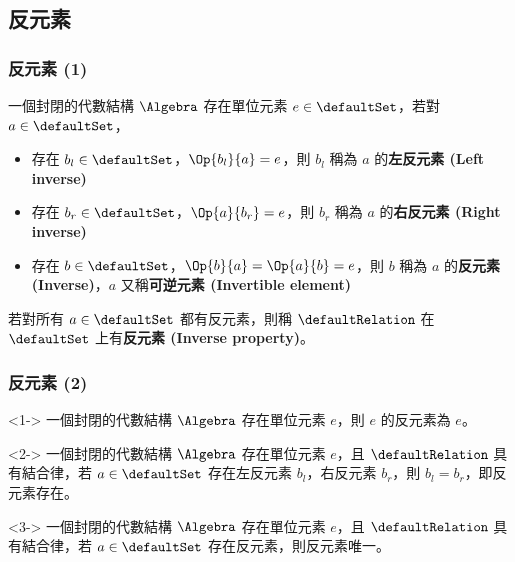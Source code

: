 \documentclass[utf8]{beamer}
\begin{document}
\begin{CJK}{UTF8}{bkai}
\subsection{反元素}

\begin{frame}
  \frametitle{反元素 (1)}
  \begin{mydef}[反元素]
  \label{def:algebra:inverse}
  一個封閉的代數結構 $\Algebra$ 存在單位元素 $e\in{\defaultSet}$，若對 $a\in{\defaultSet}$，
  \begin{itemize}
  \item 存在 $b_l\in{\defaultSet}$，$\Op{b_l}{a}=e$，則 $b_l$ 稱為 $a$ 的\textbf{左反元素 (Left inverse)}
  \item 存在 $b_r\in{\defaultSet}$，$\Op{a}{b_r}=e$，則 $b_r$ 稱為 $a$ 的\textbf{右反元素 (Right inverse)}
  \item 存在 $b\in{\defaultSet}$，$\Op{b}{a}=\Op{a}{b}=e$，則 $b$ 稱為 $a$ 的\textbf{反元素 (Inverse)}，$a$ 又稱\textbf{可逆元素 (Invertible element)}
  \end{itemize}
  若對所有 $a\in{\defaultSet}$ 都有反元素，則稱 $\defaultRelation$ 在 $\defaultSet$ 上有\textbf{反元素 (Inverse property)}。
  \end{mydef}
\end{frame}

\begin{frame}
  \frametitle{反元素 (2)}
  \begin{mypropo}<1->
  \label{pro:algebra:identity_has_inverse}
  一個封閉的代數結構 $\Algebra$ 存在單位元素 $e$，則 $e$ 的反元素為 $e$。
  \end{mypropo}
  \begin{mythm}[反元素存在性*]<2->
  \label{thm:algebra:inverse_existence}
  一個封閉的代數結構 $\Algebra$ 存在單位元素 $e$，且 $\defaultRelation$ 具有結合律，若 $a\in{\defaultSet}$ 存在左反元素 $b_l$，右反元素 $b_r$，則 $b_l=b_r$，即反元素存在。
  \end{mythm}
  \begin{mythm}[反元素唯一性*]<3->
  \label{thm:algebra:inverse_uniqueness}
  一個封閉的代數結構 $\Algebra$ 存在單位元素 $e$，且 $\defaultRelation$ 具有結合律，若 $a\in{\defaultSet}$ 存在反元素，則反元素唯一。
  \end{mythm}
\end{frame}


\end{CJK}
\end{document}
